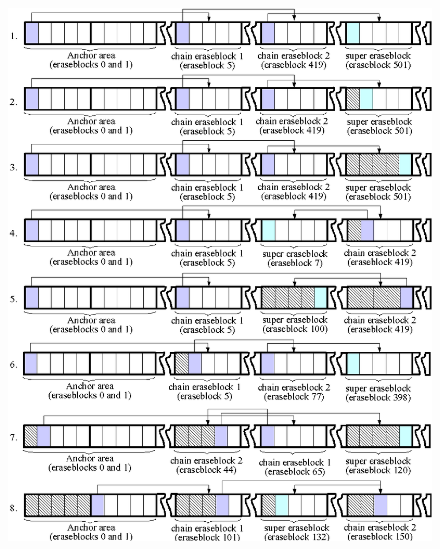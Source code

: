 \documentclass[12pt,a4paper,oneside,titlepage]{article}
\begin{document}
%
%
\begin{figure}[!t]
\begin{center}
\begin{htmlonly}
\includegraphics{pics/sb-02.png}
\end{htmlonly}

\end{center}
\end{figure}
\end{document}
